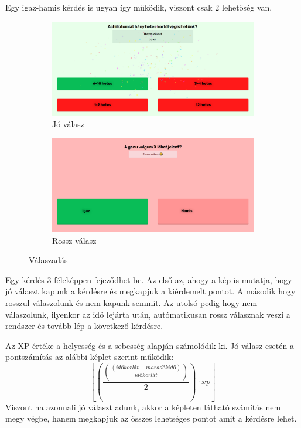 Egy igaz-hamis kérdés is ugyan így működik, viszont csak 2 lehetőség van.


\begin{figure}[H]
    \centering
    \begin{subfigure}{0.5\textwidth}
        \centering
        \includegraphics[width=\linewidth]{images/question_good.png}
        \caption{Jó válasz}
        \label{fig:sub1}
    \end{subfigure}%
    \begin{subfigure}{0.5\textwidth}
        \centering
        \includegraphics[width=\linewidth]{images/question_wrong.png}
        \caption{Rossz válasz}
        \label{fig:sub2}
    \end{subfigure}
    \caption{Válaszadás}
    \label{fig:test}
\end{figure}

Egy kérdés 3 féleképpen fejeződhet be. Az első az, ahogy a kép is mutatja, hogy jó választ kapunk a kérdésre és megkapjuk a kiérdemelt pontot. A második hogy rosszul válaszolunk és nem kapunk semmit. Az utolsó pedig hogy nem válaszolunk, ilyenkor az idő lejárta után, autómatikusan rossz válasznak veszi a rendszer és tovább lép a következő kérdésre.

Az XP értéke a helyesség és a sebesség alapján számolódik ki.
Jó válasz esetén a pontszámítás az alábbi képlet szerint működik:
\[ \left\lfloor\left(\frac{\left(\frac{\left( időkorlát - maradék idő\right)}{ időkorlát}\right)}{2}\right)\cdot xp\right\rfloor \]
Viszont ha azonnali jó választ adunk, akkor a képleten látható számítás nem megy végbe, hanem megkapjuk az összes lehetséges pontot amit a kérdésre lehet.


